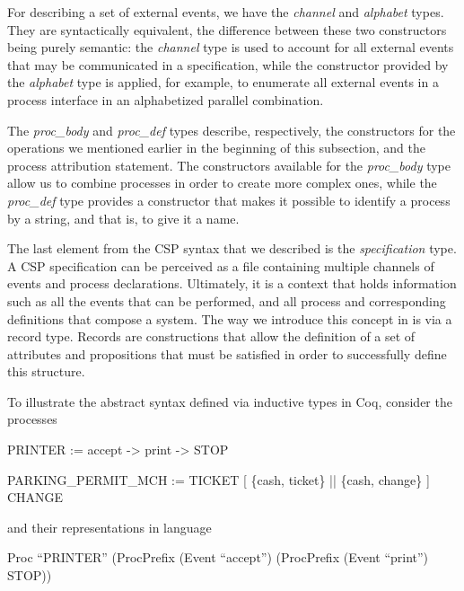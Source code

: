 For describing a set of external events, we have the \emph{channel} and \emph{alphabet} types. They are syntactically equivalent, the difference between these two constructors being purely semantic: the \emph{channel} type is used to account for all external events that may be communicated in a \CSPcoq{} specification, while the constructor provided by the \emph{alphabet} type is applied, for example, to enumerate all external events in a process interface in an alphabetized parallel combination.

The \emph{proc\_body} and \emph{proc\_def} types describe, respectively, the constructors for the operations we mentioned earlier in the beginning of this subsection, and the process attribution statement. The constructors available for the \emph{proc\_body} type allow us to combine processes in order to create more complex ones, while the \emph{proc\_def} type provides a constructor that makes it possible to identify a process by a string, and that is, to give it a name.

The last element from the CSP syntax that we described is the \emph{specification} type. A CSP specification can be perceived as a file containing multiple channels of events and process declarations. Ultimately, it is a context that holds information such as all the events that can be performed, and all process and corresponding definitions that compose a system. The way we introduce this concept in \CSPcoq{} is via a record type. Records are constructions that allow the definition of a set of attributes and propositions that must be satisfied in order to successfully define this structure.

To illustrate the abstract syntax defined via inductive types in Coq, consider the \CSPM{} processes \textellipsis

\begin{flushleft}
	PRINTER := accept -> print -> STOP
	
	PARKING\_PERMIT\_MCH := TICKET [ \{cash, ticket\} || \{cash, change\} ] CHANGE
\end{flushleft}

\begin{flushleft}	
	\textellipsis and their representations in \CSPcoq{} language \textellipsis
\end{flushleft}

\begin{flushleft}
	Proc ``PRINTER'' (ProcPrefix (Event ``accept'') (ProcPrefix (Event ``print'') STOP))
\end{flushleft}

